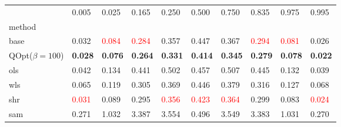 \begin{tabular}{llllllllll}
\toprule
 & 0.005 & 0.025 & 0.165 & 0.250 & 0.500 & 0.750 & 0.835 & 0.975 & 0.995 \\
method &  &  &  &  &  &  &  &  &  \\
\midrule
base & 0.032 & \textcolor{red}{0.084} & \textcolor{red}{0.284} & 0.357 & 0.447 & 0.367 & \textcolor{red}{0.294} & \textcolor{red}{0.081} & 0.026 \\
\midrule
QOpt($\beta=100$) & \textbf{0.028} & \textbf{0.076} & \textbf{0.264} & \textbf{0.331} & \textbf{0.414} & \textbf{0.345} & \textbf{0.279} & \textbf{0.078} & \textbf{0.022} \\
ols & 0.042 & 0.134 & 0.441 & 0.502 & 0.457 & 0.507 & 0.445 & 0.132 & 0.039 \\
wls & 0.065 & 0.119 & 0.305 & 0.369 & 0.446 & 0.379 & 0.316 & 0.127 & 0.068 \\
shr & \textcolor{red}{0.031} & 0.089 & 0.295 & \textcolor{red}{0.356} & \textcolor{red}{0.423} & \textcolor{red}{0.364} & 0.299 & 0.083 & \textcolor{red}{0.024} \\
sam & 0.271 & 1.032 & 3.387 & 3.554 & 0.496 & 3.549 & 3.383 & 1.031 & 0.270 \\
\bottomrule
\end{tabular}